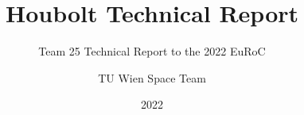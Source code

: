 \documentclass[parskip=half, twoside=false]{scrreprt}
\title{\boldmath{$\mu$}Houbolt Technical Report}
\subtitle{Team 25 Technical Report to the 2022 EuRoC}
\author{TU Wien Space Team}
\date{2022}
\begin{document}
\maketitle

\newpage

\tableofcontents

\newpage



\newpage



\newpage



\newpage



\newpage



\newpage



\newpage

\renewcommand{\bibname}{References}


\end{document}
